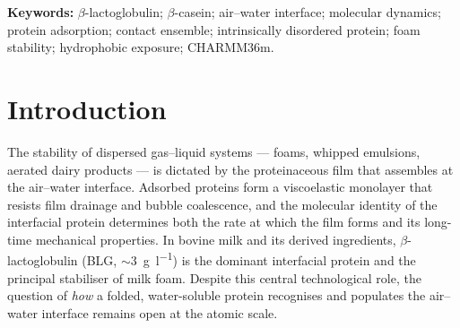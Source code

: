\documentclass[11pt,a4paper]{article}
\begin{document}
\begin{abstract}
sustained interfacial contact arises without calyx activation. The
protein remains globally compact throughout ($R_\mathrm{g} =
\SI{1.496 \pm 0.009}{\nano\metre}$ in R1; $\beta$-barrel backbone
RMSD \SIrange{0.20}{0.24}{\nano\metre} across all three near-interface
replicas), with loop CD/EF the dominant flexible region near the
interface rather than the global unfolding traditionally invoked to
explain interfacial activity.
These results establish what \SI{4.00}{\micro\second} of unbiased
atomistic MD resolves: the pre-commitment contact ensemble, with its
SASA and orientation distributions, and where the simulation boundary
lies --- gate-open and commitment steps are not sampled on this
timescale, and enhanced sampling is required to characterise the
activation barrier. The calyx-lining residues themselves (the nine
residues forming the hydrophobic pocket) remain solvent-exposed
throughout, with SASA $\SI{3.81 \pm 0.46}{\nano\metre\squared}$ (CENTER,
PBC-corrected) and no collapse toward burial --- the calyx is an
\emph{accessible} feature of native BLG, not one that opens transiently
and recloses. \textbf{[DATA PENDING]} This BLG characterisation is one
half of a planned comparative study with $\beta$-casein, an
intrinsically disordered milk protein whose unstructured, amphipathic
chain is hypothesised to present a contrasting, ``open-chain''
adsorption strategy; $\beta$-casein simulations and analysis are in
progress (Methods) and the comparative synthesis is reported in a
forthcoming revision of this manuscript.
\end{abstract}

\vspace{6pt}

\noindent\textbf{Keywords:} $\beta$-lactoglobulin; $\beta$-casein;
air--water interface; molecular dynamics; protein adsorption; contact
ensemble; intrinsically disordered protein; foam stability; hydrophobic
exposure; CHARMM36m.

\section{Introduction}

The stability of dispersed gas--liquid systems --- foams, whipped emulsions,
aerated dairy products --- is dictated by the proteinaceous film that
assembles at the air--water interface. Adsorbed proteins form a viscoelastic
monolayer that resists film drainage and bubble coalescence, and the molecular
identity of the interfacial protein determines both the rate at which the film
forms and its long-time mechanical
properties\citep{Dickinson1999,BertonCarabin2018,Damodaran2005,Narsimhan2018}. In bovine
milk and its derived ingredients, $\beta$-lactoglobulin (BLG, $\sim$\SI{3}{\gram\per\litre})
is the dominant interfacial protein and the principal stabiliser of milk
foam\citep{Cornec1999,Barbiroli2022,Huppertz2010}. Despite this central technological role,
the question of \emph{how} a folded, water-soluble protein recognises and
populates the air--water interface remains open at the atomic scale.
\end{document}
